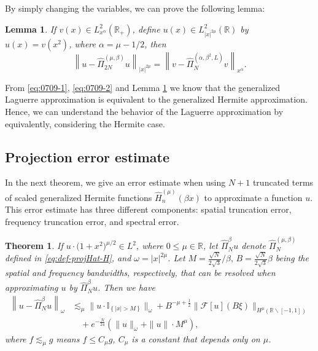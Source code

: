 \documentclass[pdflatex,sn-aps]{sn-jnl}%
\theoremstyle{thmstyleone}%
\newtheorem{theorem}{Theorem}[section]%
\newtheorem{lemma}{Lemma}[section]
\theoremstyle{thmstyletwo}%
\theoremstyle{thmstylethree}%
\begin{document}
By simply changing the variables, we can prove the following lemma:
\begin{lemma}\label{lem:equiv}
  If $v(x) \in L^2_{x^{\alpha}}(\mathbb{R}_+)$, define $u(x) \in L^2_{|x|^{2\mu}}(\mathbb{R})$ by $u(x)=v(x^2)$, where $\alpha=\mu-1/2$, then
  \begin{equation}\label{eq:equiv}
    \left\|u-\widehat{\Pi}_{2N}^{(\mu,\beta)} u\right\|_{|x|^{2 \mu}}
    =\left\|v-\widehat{\Pi}_{N}^{(\alpha,\beta^2,L)} v \right\|_{x^{\alpha}}.
  \end{equation}
\end{lemma}
From \eqref{eq:0709-1}, \eqref{eq:0709-2} and Lemma \ref{lem:equiv} we know that the
generalized Laguerre approximation is equivalent to the generalized Hermite
approximation. Hence, we can understand the behavior of the Laguerre approximation by
equivalently, considering the Hermite case. 

\subsection{Projection error estimate}
In the next theorem, we give an error estimate when using $N+1$
truncated terms of scaled generalized Hermite functions 
$\widehat{H}^{\left(\mu\right)}_n(\beta x)$ to approximate a function $u$.
This error estimate has three different components: spatial truncation
error, frequency truncation error, and spectral error.

\begin{theorem}\label{thm:bigthm}
  If $u \cdot\bigl(1+x^2\bigr)^{{\mu}/{2}} \in L^2$,
  where $0 \leqslant \mu \in \mathbb{R}$, let $\widehat{\Pi}_N^\beta u$
  denote $\widehat{\Pi}_{N}^{(\mu,\beta)}$ defined in \eqref{eq:def-projHat-H}, and
  $\omega = |x|^{2\mu}$. Let $M = \frac{\sqrt{N}}{2\sqrt{3}}/\beta,\, B = \frac{\sqrt{N}}{2\sqrt{3}} \beta$  
  being the spatial and frequency bandwidths, respectively, that can be resolved when approximating
  $u$ by $\widehat{\Pi}_N^\beta u$. Then we have
  \begin{equation}\label{eq:bigthm}
    \begin{aligned}
    \left\|u-\widehat{\Pi}_N^\beta u\right\|_\omega & 
    \lesssim_\mu \bigl\|u \cdot \mathbb{I}_{\left\{|x|>M\right\}}\bigr\|_\omega 
     +B^{-\mu+\frac{1}{2}} \bigl\| \mathcal{F}[u]\left(B \xi\right) \bigr\|_{H^{\mu}\left(\mathbb{R}\backslash [-1,1]\right)} \\
    &{} \quad +e^{-\frac{N}{24}}\left(\|u\|_\omega+\|u\| \cdot M^\mu\right),
    \end{aligned}
  \end{equation}
  where $f \lesssim_\mu g$ means $f \leqslant C_{\mu} g$,  $C_{\mu}$ is a constant that depends only on $\mu$.
\end{theorem}
\end{document}
